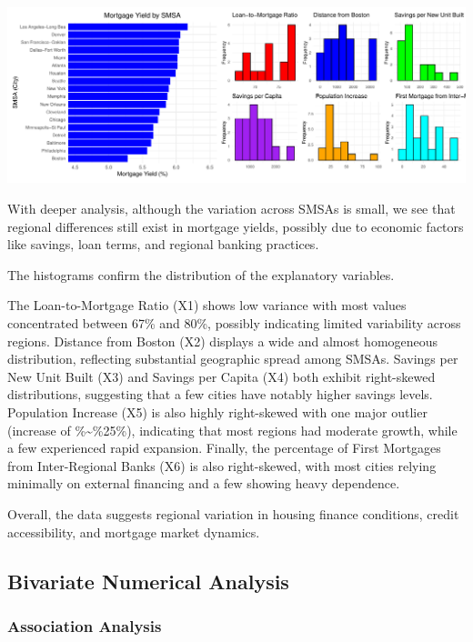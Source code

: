 \documentclass[
  11pt,
]{article}
\begin{document}
\includegraphics{Figs/unnamed-chunk-4-1.pdf}

With deeper analysis, although the variation across SMSAs is small, we
see that regional differences still exist in mortgage yields, possibly
due to economic factors like savings, loan terms, and regional banking
practices.

The histograms confirm the distribution of the explanatory variables.

The Loan-to-Mortgage Ratio (X1) shows low variance with most values
concentrated between 67\% and 80\%, possibly indicating limited
variability across regions. Distance from Boston (X2) displays a wide
and almost homogeneous distribution, reflecting substantial geographic
spread among SMSAs. Savings per New Unit Built (X3) and Savings per
Capita (X4) both exhibit right-skewed distributions, suggesting that a
few cities have notably higher savings levels. Population Increase (X5)
is also highly right-skewed with one major outlier (increase of
\%\textasciitilde\%25\%), indicating that most regions had moderate
growth, while a few experienced rapid expansion. Finally, the percentage
of First Mortgages from Inter-Regional Banks (X6) is also right-skewed,
with most cities relying minimally on external financing and a few
showing heavy dependence.

Overall, the data suggests regional variation in housing finance
conditions, credit accessibility, and mortgage market dynamics.

\subsection{Bivariate Numerical
Analysis}\label{bivariate-numerical-analysis}

\subsubsection{Association Analysis}\label{association-analysis}
\end{document}
